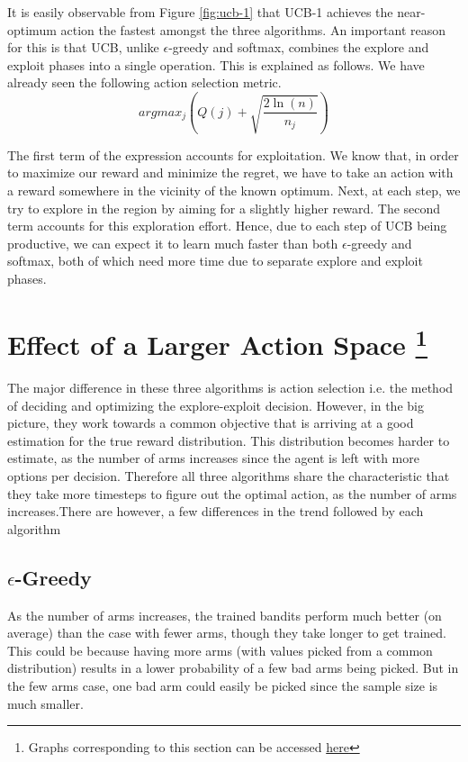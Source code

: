 \documentclass[12pt]{extarticle}
\begin{document}
It is easily observable from Figure \ref{fig:ucb-1} that UCB-1 achieves the near-optimum action the fastest amongst the three algorithms. An important reason for this is that UCB, unlike $\epsilon$-greedy and softmax, combines the explore and exploit phases into a single operation. This is explained as follows. We have already seen the following action selection metric.\\

\begin{equation*}
argmax_j \left(Q(j) + \sqrt{\frac{2\ln(n)}{n_j}}\right)
\end{equation*}

The first term of the expression accounts for exploitation. We know that, in order to maximize our reward and minimize the regret, we have to take an action with a reward somewhere in the vicinity of the known optimum. Next, at each step, we try to explore in the region by aiming for a slightly higher reward. The second term accounts for this exploration effort. Hence, due to each step of UCB being productive, we can expect it to learn much faster than both $\epsilon$-greedy and softmax, both of which need more time due to separate explore and exploit phases.\\

\section{Effect of a Larger Action Space \footnote{Graphs corresponding to this section can be accessed \href{https://github.com/ajaysub110/RL-experiments/tree/master/bandit/viz}{here}}}
The major difference in these three algorithms is action selection i.e. the method of deciding and optimizing the explore-exploit decision. However, in the big picture, they work towards a common objective that is arriving at a good estimation for the true reward distribution. This distribution becomes harder to estimate, as the number of arms increases since the agent is left with more options per decision. Therefore all three algorithms share the characteristic that they take more timesteps to figure out the optimal action, as the number of arms increases.There are however, a few differences in the trend followed by each algorithm

\subsection{$\epsilon$-Greedy}

As the number of arms increases, the trained bandits perform much better (on average) than the case with fewer arms, though they take longer to get trained. This could be because having more arms (with values picked from a common distribution) results in a lower probability of a few bad arms being picked. But in the few arms case, one bad arm could easily be picked since the sample size is much smaller.
\end{document}
